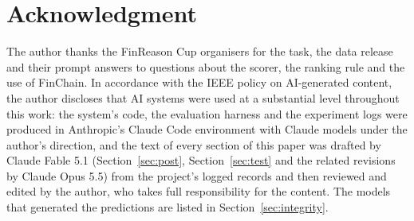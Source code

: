 \documentclass[conference]{IEEEtran}
\begin{document}
\section*{Acknowledgment}
The author thanks the FinReason Cup organisers for the task, the data release and their prompt answers to questions about the scorer, the ranking rule and the use of FinChain. In accordance with the IEEE policy on AI-generated content, the author discloses that AI systems were used at a substantial level throughout this work: the system's code, the evaluation harness and the experiment logs were produced in Anthropic's Claude Code environment with Claude models under the author's direction, and the text of every section of this paper was drafted by Claude Fable 5.1 (Section~\ref{sec:post}, Section~\ref{sec:test} and the related revisions by Claude Opus 5.5) from the project's logged records and then reviewed and edited by the author, who takes full responsibility for the content. The models that generated the predictions are listed in Section~\ref{sec:integrity}.



\end{document}
